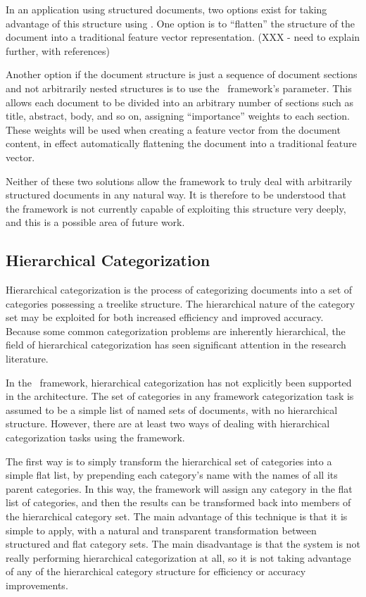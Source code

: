 In an application using structured documents, two options exist for
taking advantage of this structure using \aicat.  One option is to
``flatten'' the structure of the document into a traditional feature
vector representation. (XXX - need to explain further, with
references)  

Another option if the document structure is just a sequence of
document sections and not arbitrarily nested structures is to use the
\aicat\ framework's  parameter.  This allows
each document to be divided into an arbitrary number of sections such
as title, abstract, body, and so on, assigning ``importance'' weights
to each section.  These weights will be used when creating a feature
vector from the document content, in effect automatically flattening
the document into a traditional feature vector.

Neither of these two solutions allow the framework to truly deal with
arbitrarily structured documents in any natural way.  It is therefore
to be understood that the framework is not currently capable of
exploiting this structure very deeply, and this is a possible area of
future work.

\subsection{Hierarchical Categorization}
\label{hierarchical}

Hierarchical categorization is the process of categorizing documents
into a set of categories possessing a treelike structure.  The
hierarchical nature of the category set may be exploited for both
increased efficiency and improved accuracy.\cite{dumais:00}  Because
some common categorization problems are inherently hierarchical, the
field of hierarchical categorization has seen significant attention in
the research literature.\cite[p. 7]{sebastiani:02}

In the \aicat\ framework, hierarchical categorization has not
explicitly been supported in the architecture.  The set of categories
in any framework categorization task is assumed to be a simple list of
named sets of documents, with no hierarchical structure.  However,
there are at least two ways of dealing with hierarchical
categorization tasks using the framework.

The first way is to simply transform the hierarchical set of
categories into a simple flat list, by prepending each category's name
with the names of all its parent categories.  In this way, the
framework will assign any category in the flat list of categories, and
then the results can be transformed back into members of the
hierarchical category set.  The main advantage of this technique is
that it is simple to apply, with a natural and transparent
transformation between structured and flat category sets.  The main
disadvantage is that the system is not really performing hierarchical
categorization at all, so it is not taking advantage of any of the
hierarchical category structure for efficiency or accuracy
improvements.

